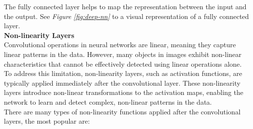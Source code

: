 The fully connected layer helps to map the representation between the input and the output. See \textit{Figure \ref{fig:deep-nn}} to a visual representation of a fully connected layer. \\

\vspace{0.5cm}
\textbf{Non-linearity Layers} \\

Convolutional operations in neural networks are linear, meaning they capture linear patterns in the data. However, many objects in images exhibit non-linear characteristics that cannot be effectively detected using linear operations alone. To address this limitation, non-linearity layers, such as activation functions, are typically applied immediately after the convolutional layer. These non-linearity layers introduce non-linear transformations to the activation maps, enabling the network to learn and detect complex, non-linear patterns in the data. \\

There are many types of non-linearity functions applied after the convolutional layers, the most popular are: \\

